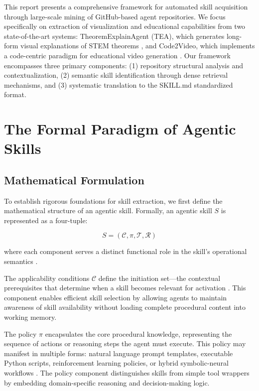 \documentclass[11pt,a4paper]{article}
\begin{document}
This report presents a comprehensive framework for automated skill acquisition through large-scale mining of GitHub-based agent repositories. We focus specifically on extraction of visualization and educational capabilities from two state-of-the-art systems: TheoremExplainAgent (TEA), which generates long-form visual explanations of STEM theorems \cite{teaproject2024, arxiv2024tea}, and Code2Video, which implements a code-centric paradigm for educational video generation \cite{arxiv2024code2video, github2024code2video}. Our framework encompasses three primary components: (1) repository structural analysis and contextualization, (2) semantic skill identification through dense retrieval mechanisms, and (3) systematic translation to the SKILL.md standardized format.

\section{The Formal Paradigm of Agentic Skills}

\subsection{Mathematical Formulation}

To establish rigorous foundations for skill extraction, we first define the mathematical structure of an agentic skill. Formally, an agentic skill $S$ is represented as a four-tuple:

\begin{equation}
S = (\mathcal{C}, \pi, \mathcal{T}, \mathcal{R})
\end{equation}

where each component serves a distinct functional role in the skill's operational semantics \cite{arxiv2024skillsemantics}.

The applicability conditions $\mathcal{C}$ define the initiation set---the contextual prerequisites that determine when a skill becomes relevant for activation \cite{arxiv2024skillsemantics}. This component enables efficient skill selection by allowing agents to maintain awareness of skill availability without loading complete procedural content into working memory.

The policy $\pi$ encapsulates the core procedural knowledge, representing the sequence of actions or reasoning steps the agent must execute. This policy may manifest in multiple forms: natural language prompt templates, executable Python scripts, reinforcement learning policies, or hybrid symbolic-neural workflows \cite{arxiv2024skillsemantics}. The policy component distinguishes skills from simple tool wrappers by embedding domain-specific reasoning and decision-making logic.
\end{document}
